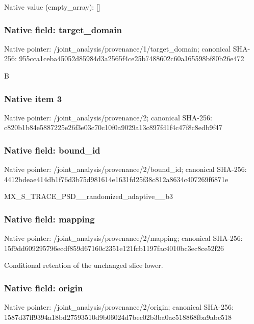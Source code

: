 \documentclass[10pt,a4paper]{article}
\begin{document}
Native value (empty\_\allowbreak{}array): []

\subsubsection{Native field: target\_\allowbreak{}domain}
Native pointer: /joint\_\allowbreak{}analysis/provenance/1/target\_\allowbreak{}domain; canonical SHA-256: 955cca1ceba45052d85984d3a2565f4ce25b7488602c60a165598bf80b26e472

\begingroup\raggedright\sloppy B\par\endgroup

\subsubsection{Native item 3}
Native pointer: /joint\_\allowbreak{}analysis/provenance/2; canonical SHA-256: c820b1b84e5887225e26f3e03c70c10f0a9029a13c897fd1f4c47f8c8edb9f47

\subsubsection{Native field: bound\_\allowbreak{}id}
Native pointer: /joint\_\allowbreak{}analysis/provenance/2/bound\_\allowbreak{}id; canonical SHA-256: 4412bdeae414db1f76d3b75d981614e1631fd25f38c812a8634c407269f6871e

\begingroup\raggedright\sloppy MX\_\allowbreak{}S\_\allowbreak{}TRACE\_\allowbreak{}PSD\_\allowbreak{}\_\allowbreak{}randomized\_\allowbreak{}adaptive\_\allowbreak{}\_\allowbreak{}b3\par\endgroup

\subsubsection{Native field: mapping}
Native pointer: /joint\_\allowbreak{}analysis/provenance/2/mapping; canonical SHA-256: 15f9dd609295796ecdf859d67160c2351e121fcb1197fac4010bc3ec8ce52f26

\begingroup\raggedright\sloppy Conditional retention of the unchanged slice lower.\par\endgroup

\subsubsection{Native field: origin}
Native pointer: /joint\_\allowbreak{}analysis/provenance/2/origin; canonical SHA-256: 1587d37ff9394a18bd27593510d9b06024d7bec02b3ba0ac518868fba9abc518
\end{document}
